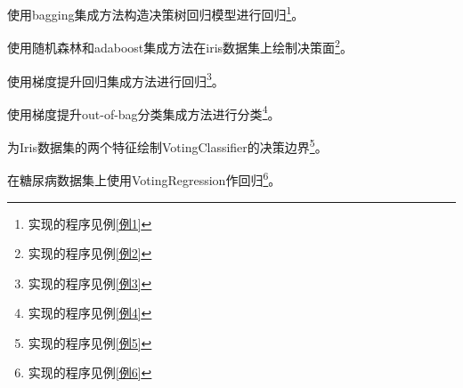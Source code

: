 \begin{Example}
	使用bagging集成方法构造决策树回归模型进行回归\footnote{实现的程序见例\ref{例1}}。
\end{Example}

\begin{Example}
	使用随机森林和adaboost集成方法在iris数据集上绘制决策面\footnote{实现的程序见例\ref{例2}}。
\end{Example}

\begin{Example}
	使用梯度提升回归集成方法进行回归\footnote{实现的程序见例\ref{例3}}。
\end{Example}

\begin{Example}
	使用梯度提升out-of-bag分类集成方法进行分类\footnote{实现的程序见例\ref{例4}}。
\end{Example}

\begin{Example}
	为Iris数据集的两个特征绘制VotingClassifier的决策边界\footnote{实现的程序见例\ref{例5}}。
\end{Example}

\begin{Example}
	在糖尿病数据集上使用VotingRegression作回归\footnote{实现的程序见例\ref{例6}}。
\end{Example}